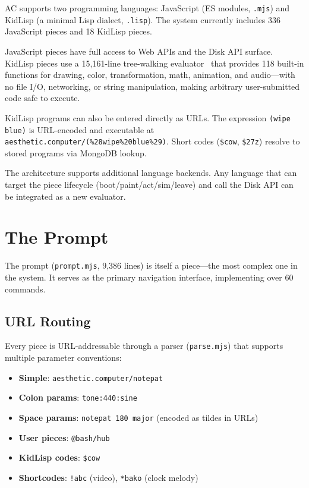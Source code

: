 \documentclass[10pt,letterpaper,twocolumn]{article}
\begin{document}
AC supports two programming languages: JavaScript (ES modules, \texttt{.mjs}) and KidLisp (a minimal Lisp dialect, \texttt{.lisp}). The system currently includes 336 JavaScript pieces and 18 KidLisp pieces.

JavaScript pieces have full access to Web APIs and the Disk API surface. KidLisp pieces use a 15,161-line tree-walking evaluator~\citep{scudder2026kidlisp} that provides 118 built-in functions for drawing, color, transformation, math, animation, and audio---with no file I/O, networking, or string manipulation, making arbitrary user-submitted code safe to execute.

KidLisp programs can also be entered directly as URLs. The expression \texttt{(wipe blue)} is URL-encoded and executable at \texttt{aesthetic.computer/(\%28wipe\%20blue\%29)}. Short codes (\texttt{\$cow}, \texttt{\$27z}) resolve to stored programs via MongoDB lookup.

The architecture supports additional language backends. Any language that can target the piece lifecycle (boot/paint/act/sim/leave) and call the Disk API can be integrated as a new evaluator.


\section{The Prompt}
\label{sec:prompt}

The prompt (\texttt{prompt.mjs}, 9,386 lines) is itself a piece---the most complex one in the system. It serves as the primary navigation interface, implementing over 60 commands.

\subsection{URL Routing}

Every piece is URL-addressable through a parser (\texttt{parse.mjs}) that supports multiple parameter conventions:

\begin{itemize}
  \item \textbf{Simple}: \texttt{aesthetic.computer/notepat}
  \item \textbf{Colon params}: \texttt{tone:440:sine}
  \item \textbf{Space params}: \texttt{notepat 180 major} (encoded as tildes in URLs)
  \item \textbf{User pieces}: \texttt{@bash/hub}
  \item \textbf{KidLisp codes}: \texttt{\$cow}
  \item \textbf{Shortcodes}: \texttt{!abc} (video), \texttt{*bako} (clock melody)
\end{itemize}
\end{document}
